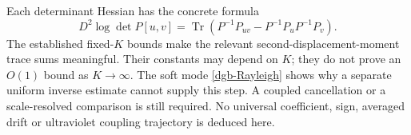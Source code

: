 Each determinant Hessian has the concrete formula
\begin{equation}
 D^2\log\det P[u,v]
   =\operatorname{Tr}\left(
       P^{-1}P_{uv}-P^{-1}P_uP^{-1}P_v\right).
 \label{dgb-trace-interface}
\end{equation}
The established fixed-$K$ bounds make the relevant
second-displacement-moment trace sums meaningful. Their
constants may depend on $K$; they do not prove an $O(1)$
bound as $K\to\infty$.
The soft mode \eqref{dgb-Rayleigh} shows why a separate
uniform inverse estimate cannot supply this step.
A coupled cancellation or a scale-resolved comparison
is still required. No universal coefficient, sign,
averaged drift or ultraviolet coupling trajectory is
deduced here.
